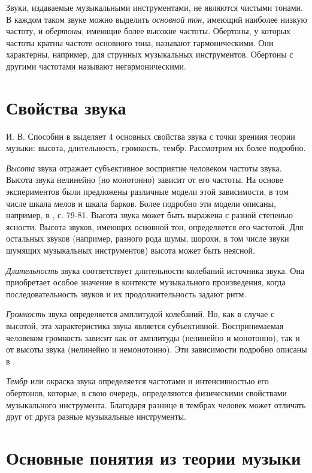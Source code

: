 Звуки, издаваемые музыкальными инструментами, не являются чистыми тонами. В
каждом таком звуке можно выделить \emph{основной тон}, имеющий наиболее низкую
частоту, и \emph{обертоны}, имеющие более высокие частоты. Обертоны, у которых
частоты кратны частоте основного тона, называют гармоническими. Они
характерны, например, для струнных музыкальных инструментов. Обертоны с другими
частотами называют негармоническими.

\section{Свойства звука} \label{sectT_prop}

И. В. Способин в \cite{Sposobin2012} выделяет 4 основных свойства звука с точки
зрениия теории музыки: высота, длительность, громкость, тембр. Рассмотрим их
более подробно.

\emph{Высота} звука отражает субъективное восприятие человеком частоты звука.
Высота звука нелинейно (но монотонно) зависит от его частоты. На основе
экспериментов были предложены различные модели этой зависимости, в том числе
шкала мелов и шкала барков. Более подробно эти модели описаны, например, в
\cite{Lerch2012}, с. 79-81. Высота звука может быть выражена с разной степенью
ясности. Высота звуков, имеющих основной тон, определяется его частотой. Для
остальных звуков (например, разного рода шумы, шорохи, в том числе звуки шумящих
музыкальных инструментов) высота может быть неясной.

\emph{Длительность} звука соответствует длительности колебаний источника звука.
Она приобретает особое значение в контексте музыкального произведения, когда
последовательность звуков и их продолжительность задают ритм.

\emph{Громкость} звука определяется амплитудой колебаний. Но, как в случае с
высотой, эта характеристика звука является субъективной. Воспринимаемая
человеком громкость зависит как от амплитуды (нелинейно и монотонно), так и от
высоты звука (нелинейно и немонотонно). Эти зависимости подробно описаны в
\cite{Fastl2007}.

\emph{Тембр} или окраска звука определяется частотами и интенсивностью его
обертонов, которые, в свою очередь, определяются физическими свойствами
музыкального инструмента. Благодаря разнице в тембрах человек может отличать
друг от друга разные музыкальные инструменты.

\section{Основные понятия из теории музыки} \label{sectT_music}


